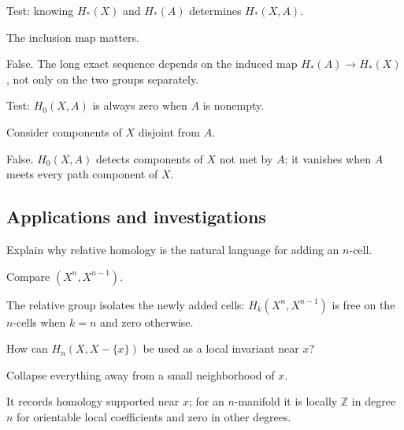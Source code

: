 \begin{exercise}\label{exr:viii19-ped-11}
Test: knowing $H_*(X)$ and $H_*(A)$ determines $H_*(X,A)$.
\end{exercise}
\begin{hint}
The inclusion map matters.
\end{hint}
\begin{solution}
False. The long exact sequence depends on the induced map $H_*(A)\to H_*(X)$, not only on the two groups separately.
\end{solution}

\begin{exercise}\label{exr:viii19-ped-12}
Test: $H_0(X,A)$ is always zero when $A$ is nonempty.
\end{exercise}
\begin{hint}
Consider components of $X$ disjoint from $A$.
\end{hint}
\begin{solution}
False. $H_0(X,A)$ detects components of $X$ not met by $A$; it vanishes when $A$ meets every path component of $X$.
\end{solution}

\subsection*{Applications and investigations}

\begin{exercise}\label{exr:viii19-ped-13}
Explain why relative homology is the natural language for adding an $n$-cell.
\end{exercise}
\begin{hint}
Compare $(X^n,X^{n-1})$.
\end{hint}
\begin{solution}
The relative group isolates the newly added cells: $H_k(X^n,X^{n-1})$ is free on the $n$-cells when $k=n$ and zero otherwise.
\end{solution}

\begin{exercise}\label{exr:viii19-ped-14}
How can $H_n(X,X-\{x\})$ be used as a local invariant near $x$?
\end{exercise}
\begin{hint}
Collapse everything away from a small neighborhood of $x$.
\end{hint}
\begin{solution}
It records homology supported near $x$; for an $n$-manifold it is locally $\mathbb Z$ in degree $n$ for orientable local coefficients and zero in other degrees.
\end{solution}

